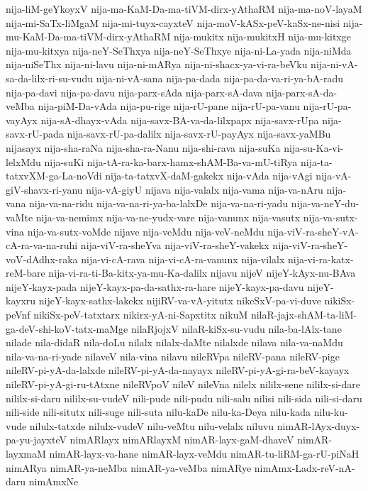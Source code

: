 {nija-liM-geYkoyxV
nija-ma-KaM-Da-ma-tiVM-dirx-yAthaRM
nija-ma-noV-layaM
nija-mi-SaTx-liMgaM
nija-mi-tuyx-cayxteV
nija-moV-kASx-peV-kaSx-ne-nisi
nija-mu-KaM-Da-ma-tiVM-dirx-yAthaRM
nija-mukitx
nija-mukitxH
nija-mu-kitxge
nija-mu-kitxya
nija-neY-SeThxya
nija-neY-SeThxye
nija-ni-La-yada
nija-niMda
nija-niSeThx
nija-ni-lavu
nija-ni-mARya
nija-ni-shacx-ya-vi-ra-beVku
nija-ni-vA-sa-da-lilx-ri-su-vudu
nija-ni-vA-sana
nija-pa-dada
nija-pa-da-va-ri-ya-bA-radu
nija-pa-davi
nija-pa-davu
nija-parx-sAda
nija-parx-sA-dava
nija-parx-sA-da-veMba
nija-piM-Da-vAda
nija-pu-rige
nija-rU-pane
nija-rU-pa-vanu
nija-rU-pa-vayAyx
nija-sA-dhayx-vAda
nija-savx-BA-va-da-lilxpapx
nija-savx-rUpa
nija-savx-rU-pada
nija-savx-rU-pa-dalilx
nija-savx-rU-payAyx
nija-savx-yaMBu
nijasayx
nija-sha-raNa
nija-sha-ra-Nanu
nija-shi-rava
nija-suKa
nija-su-Ka-vi-lelxMdu
nija-suKi
nija-tA-ra-ka-barx-hamx-shAM-Ba-va-mU-tiRya
nija-ta-tatxvXM-ga-La-noVdi
nija-ta-tatxvX-daM-gakekx
nija-vAda
nija-vAgi
nija-vA-giV-shavx-ri-yanu
nija-vA-giyU
nijava
nija-valalx
nija-vama
nija-va-nAru
nija-vana
nija-va-na-ridu
nija-va-na-ri-ya-ba-lalxDe
nija-va-na-ri-yadu
nija-va-neY-du-vaMte
nija-va-nemimx
nija-va-ne-yudx-vare
nija-vanunx
nija-vasutx
nija-va-sutx-vina
nija-va-sutx-voMde
nijave
nija-veMdu
nija-veV-neMdu
nija-viV-ra-sheY-vA-cA-ra-va-na-ruhi
nija-viV-ra-sheYva
nija-viV-ra-sheY-vakekx
nija-viV-ra-sheY-voV-dAdhx-raka
nija-vi-cA-rava
nija-vi-cA-ra-vanunx
nija-vilalx
nija-vi-ra-katx-reM-bare
nija-vi-ra-ti-Ba-kitx-ya-mu-Ka-dalilx
nijavu
nijeV
nijeY-kAyx-nu-BAva
nijeY-kayx-pada
nijeY-kayx-pa-da-sathx-ra-hare
nijeY-kayx-pa-davu
nijeY-kayxru
nijeY-kayx-sathx-lakekx
nijiRV-va-vA-yitutx
nikeSxV-pa-vi-duve
nikiSx-peVnf
nikiSx-peV-tatxtarx
nikirx-yA-ni-Sapxtitx
nikuM
nilaR-jajx-shAM-ta-liM-ga-deV-shi-koV-tatx-maMge
nilaRjojxV
nilaR-kiSx-su-vudu
nila-ba-lAlx-tane
nilade
nila-didaR
nila-doLu
nilalx
nilalx-daMte
nilalxde
nilava
nila-va-naMdu
nila-va-na-ri-yade
nilaveV
nila-vina
nilavu
nileRVpa
nileRV-pana
nileRV-pige
nileRV-pi-yA-da-lalxde
nileRV-pi-yA-da-nayayx
nileRV-pi-yA-gi-ra-beV-kayayx
nileRV-pi-yA-gi-ru-tAtxne
nileRVpoV
nileV
nileVna
nilelx
nililx-sene
nililx-si-dare
nililx-si-daru
nililx-su-vudeV
nili-pude
nili-pudu
nili-salu
nilisi
nili-sida
nili-si-daru
nili-side
nili-situtx
nili-suge
nili-suta
nilu-kaDe
nilu-ka-Deya
nilu-kada
nilu-ku-vude
nilulx-tatxde
nilulx-vudeV
nilu-veMtu
nilu-velalx
niluvu
nimAR-lAyx-duyx-pa-yu-jayxteV
nimARlayx
nimARlayxM
nimAR-layx-gaM-dhaveV
nimAR-layxmaM
nimAR-layx-va-hane
nimAR-layx-veMdu
nimAR-tu-liRM-ga-rU-piNaH
nimARya
nimAR-ya-neMba
nimAR-ya-veMba
nimARye
nimAmx-Ladx-reV-nA-daru
nimAmxNe
}
